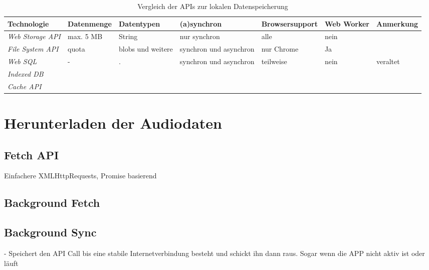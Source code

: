 \begin{table}[h]
  \caption{Vergleich der APIs zur lokalen Datenspeicherung}
  \label{Kap4:Datenspeicherung}
  \renewcommand{\arraystretch}{1.2}
  \centering
  \sffamily
  \begin{footnotesize}
    \begin{tabularx}{1.0\textwidth}{l l l l l l l}
      \toprule
      \textbf{Technologie} & \textbf{Datenmenge} & \textbf{Datentypen} & \textbf{(a)synchron} & \textbf{Browsersupport} & \textbf{Web Worker} & \textbf{Anmerkung} \\
      \midrule
      \emph{Web Storage \ac{API}} & max. 5 \ac{MB} & String & nur synchron & alle & nein & \\
      \emph{File System \ac{API}} & quota  & \acp{blob} und weitere & synchron und asynchron & nur Chrome & Ja &  \\
      \emph{Web SQL} & - & . & synchron und asynchron & teilweise & nein & veraltet \\
      \emph{Indexed DB} &  &  &  &  &  & \\
      \emph{Cache \ac{API}} &  &  &  &  &  & \\
      \bottomrule
    \end{tabularx}
  \end{footnotesize}
  \rmfamily
\end{table}

\section{Herunterladen der Audiodaten}

\subsection{Fetch API}

Einfachere XMLHttpRequests, Promise basierend
\autocite{Rojas2020}

\subsection{Background Fetch}

\subsection{Background Sync}

- Speichert den API Call bis eine stabile Internetverbindung besteht und schickt ihn dann raus. Sogar wenn die APP nicht aktiv ist oder läuft \autocite{Sheppard2017}

